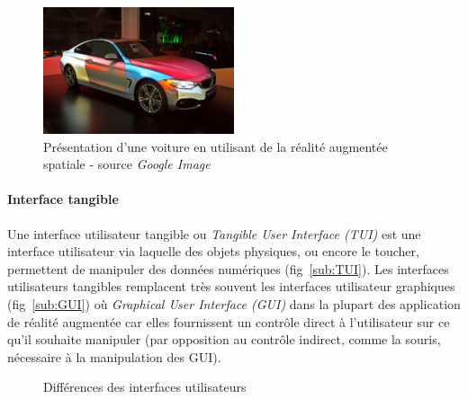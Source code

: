 \begin{figure}[h]
\centering
\includegraphics[width=0.5\textwidth]{images/SARMappingCar2}
\caption{Présentation d'une voiture en utilisant de la réalité augmentée spatiale - source \textit{Google Image}}
\label{fig:SAR}
\end{figure}

\paragraph{Interface tangible}
Une interface utilisateur tangible ou \emph{Tangible User Interface (TUI)} est une interface utilisateur via laquelle des objets physiques, ou encore le toucher, permettent de manipuler des données numériques (fig~\ref{sub:TUI}). Les interfaces utilisateurs tangibles remplacent très souvent les interfaces utilisateur graphiques (fig~\ref{sub:GUI}) où \emph{Graphical User Interface (GUI)} dans la plupart des application de réalité augmentée car elles fournissent un contrôle direct à l'utilisateur sur ce qu'il souhaite manipuler (par opposition au contrôle indirect, comme la souris, nécessaire à la manipulation des GUI).

\begin{figure}[h]
    \centering
\caption{Différences des interfaces utilisateurs}
\label{fig:GUITUI}
\end{figure}



